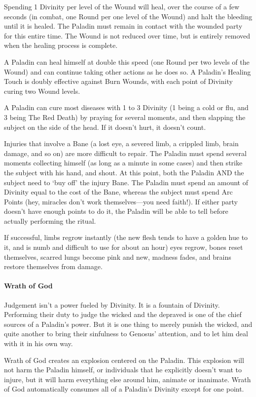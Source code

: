 \documentclass[oneside,11pt,english]{book}
\begin{document}
Spending 1 Divinity per level of the Wound will heal, over the course of a few seconds (in 
combat, one Round per one level of the Wound) and halt the bleeding until it is healed. The 
Paladin must remain in contact with the wounded party for this entire time. The Wound is not 
reduced over time, but is entirely removed when the healing process is complete. 


A Paladin can heal himself at double this speed (one Round per two levels of the Wound) and can 
continue taking other actions as he does so. A Paladin's Healing Touch is doubly effective against 
Burn Wounds, with each point of Divinity curing two Wound levels. 


A Paladin can cure most diseases with 1 to 3 Divinity (1 being a cold or flu, and 3 being The Red 
Death) by praying for several moments, and then slapping the subject on the side of the head. If it 
doesn't hurt, it doesn't count. 


Injuries that involve a Bane (a lost eye, a severed limb, a crippled limb, brain damage, and so on) 
are more difficult to repair. The Paladin must spend several moments collecting himself (as long 
as a minute in some cases) and then strike the subject with his hand, and shout. At this point, both 
the Paladin AND the subject need to ‘buy off’ the injury Bane. The Paladin must spend an 
amount of Divinity equal to the cost of the Bane, whereas the subject must spend Arc Points (hey, 
miracles don't work themselves—you need faith!). If either party doesn't have enough points to 
do it, the Paladin will be able to tell before actually performing the ritual. 


If successful, limbs regrow instantly (the new flesh tends to have a golden hue to it, and is numb 
and difficult to use for about an hour) eyes regrow, bones reset themselves, scarred lungs become 
pink and new, madness fades, and brains restore themselves from damage.
\paragraph{Wrath of God}
Judgement isn't a power fueled by Divinity. It is a fountain of Divinity. Performing their duty to 
judge the wicked and the depraved is one of the chief sources of a Paladin's power. But it is one 
thing to merely punish the wicked, and quite another to bring their sinfulness to Genosus’ 
attention, and to let him deal with it in his own way. 


Wrath of God creates an explosion centered on the Paladin. This explosion will not harm the 
Paladin himself, or individuals that he explicitly doesn't want to injure, but it will harm 
everything else around him, animate or inanimate. Wrath of God automatically consumes all of a 
Paladin's Divinity except for one point. 
\end{document}

